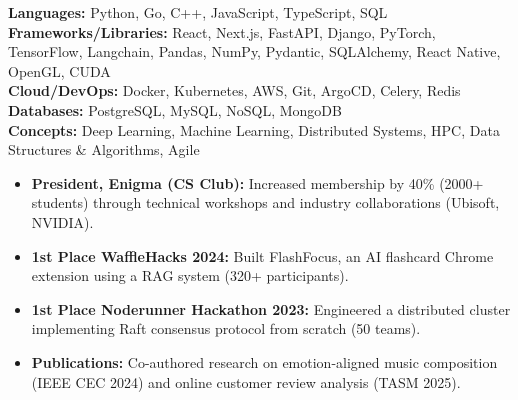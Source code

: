 \documentclass[9pt]{developercv} %
\begin{document}


\textbf{Languages:} Python, Go, C++, JavaScript, TypeScript, SQL\\
\textbf{Frameworks/Libraries:} React, Next.js, FastAPI, Django, PyTorch, TensorFlow, Langchain, Pandas, NumPy, Pydantic, SQLAlchemy, React Native, OpenGL, CUDA\\
\textbf{Cloud/DevOps:} Docker, Kubernetes, AWS, Git, ArgoCD, Celery, Redis\\
\textbf{Databases:} PostgreSQL, MySQL, NoSQL, MongoDB\\
\textbf{Concepts:} Deep Learning, Machine Learning, Distributed Systems, HPC, Data Structures \& Algorithms, Agile

\vspace{0.5cm} %


\begin{itemize}
    \item \textbf{President, Enigma (CS Club):} Increased membership by 40\% (2000+ students) through technical workshops and industry collaborations (Ubisoft, NVIDIA).
    \item \textbf{1st Place WaffleHacks 2024:} Built FlashFocus, an AI flashcard Chrome extension using a RAG system (320+ participants).
    \item \textbf{1st Place Noderunner Hackathon 2023:} Engineered a distributed cluster implementing Raft consensus protocol from scratch (50 teams).
    \item \textbf{Publications:} Co-authored research on emotion-aligned music composition (IEEE CEC 2024) and online customer review analysis (TASM 2025).
\end{itemize}

\end{document}
